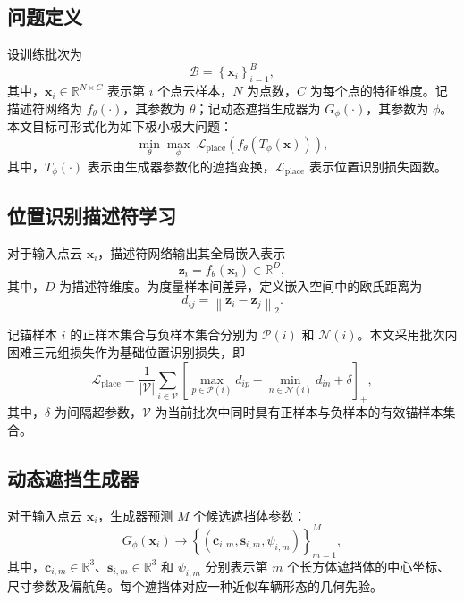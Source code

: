 \documentclass[UTF8,a4paper,12pt]{ctexart}
\newcommand{\R}{\mathbb{R}}
\newcommand{\norm}[1]{\left\lVert #1 \right\rVert_2}
\newcommand{\relu}[1]{\left[#1\right]_+}
\newcommand{\setc}[1]{\left\{#1\right\}}
\begin{document}
\subsection{问题定义}
设训练批次为
\begin{equation}
\mathcal{B}=\setc{\bm{x}_i}_{i=1}^{B},
\end{equation}
其中，$\bm{x}_i\in\R^{N\times C}$ 表示第 $i$ 个点云样本，$N$ 为点数，$C$ 为每个点的特征维度。记描述符网络为 $f_{\theta}(\cdot)$，其参数为 $\theta$；记动态遮挡生成器为 $G_{\phi}(\cdot)$，其参数为 $\phi$。本文目标可形式化为如下极小极大问题：
\begin{equation}
\min_{\theta}\max_{\phi}\ \mathcal{L}_{\mathrm{place}}\!\left(f_{\theta}\!\left(T_{\phi}(\bm{x})\right)\right),
\label{eq:minmax}
\end{equation}
其中，$T_{\phi}(\cdot)$ 表示由生成器参数化的遮挡变换，$\mathcal{L}_{\mathrm{place}}$ 表示位置识别损失函数。

\subsection{位置识别描述符学习}
对于输入点云 $\bm{x}_i$，描述符网络输出其全局嵌入表示
\begin{equation}
\bm{z}_i=f_{\theta}(\bm{x}_i)\in\R^{D},
\end{equation}
其中，$D$ 为描述符维度。为度量样本间差异，定义嵌入空间中的欧氏距离为
\begin{equation}
d_{ij}=\norm{\bm{z}_i-\bm{z}_j}.
\label{eq:pairwise_distance}
\end{equation}

记锚样本 $i$ 的正样本集合与负样本集合分别为 $\mathcal{P}(i)$ 和 $\mathcal{N}(i)$。本文采用批次内困难三元组损失作为基础位置识别损失，即
\begin{equation}
\mathcal{L}_{\mathrm{place}}
=
\frac{1}{|\mathcal{V}|}
\sum_{i\in\mathcal{V}}
\relu{
\max_{p\in\mathcal{P}(i)} d_{ip}
-
\min_{n\in\mathcal{N}(i)} d_{in}
+ \delta
},
\label{eq:place_loss}
\end{equation}
其中，$\delta$ 为间隔超参数，$\mathcal{V}$ 为当前批次中同时具有正样本与负样本的有效锚样本集合。

\subsection{动态遮挡生成器}
对于输入点云 $\bm{x}_i$，生成器预测 $M$ 个候选遮挡体参数：
\begin{equation}
G_{\phi}(\bm{x}_i)\rightarrow
\setc{
\left(\bm{c}_{i,m},\bm{s}_{i,m},\psi_{i,m}\right)
}_{m=1}^{M},
\label{eq:generator_output}
\end{equation}
其中，$\bm{c}_{i,m}\in\R^{3}$、$\bm{s}_{i,m}\in\R^{3}$ 和 $\psi_{i,m}$ 分别表示第 $m$ 个长方体遮挡体的中心坐标、尺寸参数及偏航角。每个遮挡体对应一种近似车辆形态的几何先验。
\end{document}

